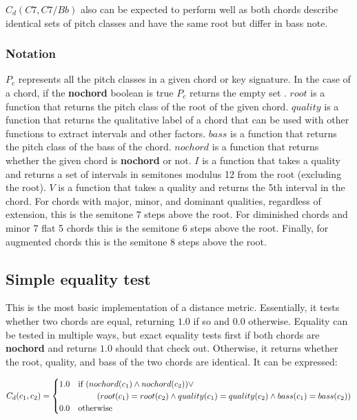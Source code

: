 $C_d(C7, C7/Bb)$ also can be expected to perform well as both chords describe identical sets of pitch classes and have the same root but differ in bass note.

\subsubsection{Notation}

$P_c$ represents all the pitch classes in a given chord or key signature. In the case of a chord, if the \textbf{nochord} boolean is true $P_c$ returns the empty set ${}$.
$root$ is a function that returns the pitch class of the root of the given chord.
$quality$ is a function that returns the qualitative label of a chord that can be used with other functions to extract intervals and other factors.
$bass$ is a function that returns the pitch class of the bass of the chord.
$nochord$ is a function that returns whether the given chord is \textbf{nochord} or not.
$I$ is a function that takes a quality and returns a set of intervals in semitones modulus 12 from the root (excluding the root).
$V$ is a function that takes a quality and returns the 5th interval in the chord. For chords with major, minor, and dominant qualities, regardless of extension, this is the semitone $7$ steps above the root. For diminished chords and minor 7 flat 5 chords this is the semitone $6$ steps above the root. Finally, for augmented chords this is the semitone $8$ steps above the root.

\subsection{Simple equality test}

This is the most basic implementation of a distance metric. Essentially, it tests whether two chords are equal, returning $1.0$ if so and $0.0$ otherwise. Equality can be tested in multiple ways, but exact equality tests first if both chords are \textbf{nochord} and returns $1.0$ should that check out. Otherwise, it returns whether the root, quality, and bass of the two chords are identical. It can be expressed:

\[ C_d(c_1,c_2) = \begin{cases} 1.0 & \text{if }(nochord(c_1) \land nochord(c_2)) \lor \\ & \hspace{0.8cm}(root(c_1) = root(c_2) \land quality(c_1) = quality(c_2) \land bass(c_1) = bass(c_2)) \\ 0.0 & \text{otherwise} \end{cases} \]

